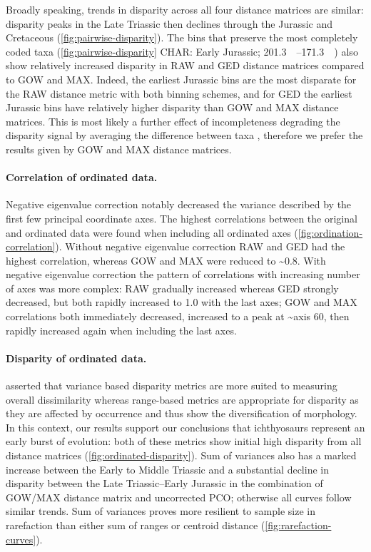 \documentclass[british,a4paper]{article}
\newcommand\pcref[1]{(\cref{#1})}
\begin{document}
Broadly speaking, trends in disparity across all four distance matrices are similar: disparity peaks in the Late Triassic then declines through the Jurassic and Cretaceous \pcref{fig:pairwise-disparity}. The bins that preserve the most completely coded taxa (\cref{fig:pairwise-disparity} CHAR: Early Jurassic; \SIrange{201.3}{171.3}{\mega\annum}) also show relatively increased disparity in RAW and GED distance matrices compared to GOW and MAX. Indeed, the earliest Jurassic bins are the most disparate for the RAW distance metric with both binning schemes, and for GED the earliest Jurassic bins have relatively higher disparity than GOW and MAX distance matrices. This is most likely a further effect of incompleteness degrading the disparity signal by averaging the difference between taxa \autocite{Flannery-Sutherland2019, Lehmann2019}, therefore we prefer the results given by GOW and MAX distance matrices.

\paragraph{Correlation of ordinated data.}\label{par:pco-correlation}

Negative eigenvalue correction notably decreased the variance described by the first few principal coordinate axes. The highest correlations between the original and ordinated data were found when including all ordinated axes \pcref{fig:ordination-correlation}. Without negative eigenvalue correction RAW and GED had the highest correlation, whereas GOW and MAX were reduced to \textasciitilde{}0.8. With negative eigenvalue correction the pattern of correlations with increasing number of axes was more complex: RAW gradually increased whereas GED strongly decreased, but both rapidly increased to 1.0 with the last axes; GOW and MAX correlations both immediately decreased, increased to a peak at \textasciitilde{}axis 60, then rapidly increased again when including the last axes.

\paragraph{Disparity of ordinated data.}\label{par:ordinated-disparity}

\textcite{Wills1998} asserted that variance based disparity metrics are more suited to measuring overall dissimilarity whereas range-based metrics are appropriate for disparity as they are affected by occurrence and thus show the diversification of morphology. In this context, our results support our conclusions that ichthyosaurs represent an early burst of evolution: both of these metrics show initial high disparity from all distance matrices (\cref{fig:ordinated-disparity}). Sum of variances also has a marked increase between the Early to Middle Triassic and a substantial decline in disparity between the Late Triassic–Early Jurassic in the combination of GOW/MAX distance matrix and uncorrected PCO; otherwise all curves follow similar t{}rends. Sum of variances proves more resilient to sample size in rarefaction than either sum of ranges or centroid distance (\cref{fig:rarefaction-curves}).
\end{document}
